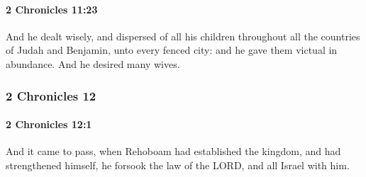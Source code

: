 		\paragraph{2 Chronicles 11:23} %
			\label{2CHRONICLES-11-23}

			And he dealt wisely, and dispersed of all his children throughout all the countries of Judah and Benjamin, unto every fenced city: and he gave them victual in abundance. And he desired many wives.

	\subsubsection{2 Chronicles 12} %
		\label{2CHRONICLES-12}

		\paragraph{2 Chronicles 12:1} %
			\label{2CHRONICLES-12-1}

			And it came to pass, when Rehoboam had established the kingdom, and had strengthened himself, he forsook the law of the LORD, and all Israel with him.

